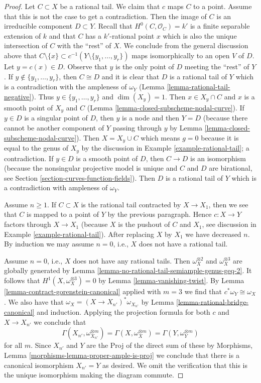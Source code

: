 \documentclass{stacks-project}
\theoremstyle{plain}
\theoremstyle{definition}
\theoremstyle{remark}
\numberwithin{equation}{subsection}
\begin{document}
\begin{proof}
\medskip\noindent
Let $C \subset X$ be a rational tail.
We claim that $c$ maps $C$ to a point. Assume that this
is not the case to get a contradiction. Then the image
of $C$ is an irreducible component $D \subset Y$.
Recall that $H^0(C, \mathcal{O}_C) = k'$ is a finite separable
extension of $k$ and that $C$ has a $k'$-rational point $x$
which is also the unique intersection of $C$ with the ``rest'' of $X$.
We conclude from the general discussion above that
$C \setminus \{x\} \subset c^{-1}(Y \setminus \{y_1, \ldots, y_r\})$
maps isomorphically to an open $V$ of $D$. Let $y = c(x) \in D$.
Observe that $y$ is the only point of $D$ meeting the
``rest'' of $Y$. If $y \not \in \{y_1, \ldots, y_r\}$, then $C \cong D$
and it is clear that $D$ is a rational tail of $Y$ which is
a contradiction with the ampleness of $\omega_Y$
(Lemma \ref{lemma-rational-tail-negative}).
Thus $y \in \{y_1, \ldots, y_r\}$ and $\dim(X_y) = 1$.
Then $x \in X_y \cap C$ and $x$ is a smooth point of $X_y$ and $C$
(Lemma \ref{lemma-closed-subscheme-nodal-curve}).
If $y \in D$ is a singular point of $D$, then $y$ is a node
and then $Y = D$ (because there cannot be another component of
$Y$ passing through $y$ by Lemma \ref{lemma-closed-subscheme-nodal-curve}).
Then $X = X_y \cup C$ which means $g = 0$ because it is
equal to the genus of $X_y$ by the discussion in
Example \ref{example-rational-tail}; a contradiction.
If $y \in D$ is a smooth point of $D$, then
$C \to D$ is an isomorphism (because the nonsingular projective
model is unique and $C$ and $D$ are birational, see
Section \ref{section-curves-function-fields}). Then $D$ is
a rational tail of $Y$ which is a contradiction with
ampleness of $\omega_Y$.

\medskip\noindent
Assume $n \geq 1$. If $C \subset X$ is the rational tail contracted
by $X \to X_1$, then we see that $C$ is mapped to a point of $Y$ by
the previous paragraph. Hence $c : X \to Y$ factors through $X \to X_1$
(because $X$ is the pushout of $C$ and $X_1$, see discussion in
Example \ref{example-rational-tail}).
After replacing $X$ by $X_1$ we have decreased
$n$. By induction we may assume $n = 0$, i.e., $X$ does not have
a rational tail.

\medskip\noindent
Assume $n = 0$, i.e., $X$ does not have any rational tails.
Then $\omega_X^{\otimes 2}$ and $\omega_X^{\otimes 3}$ are
globally generated by Lemma \ref{lemma-no-rational-tail-semiample-genus-geq-2}.
It follows that $H^1(X, \omega_X^{\otimes 3}) = 0$ by
Lemma \ref{lemma-vanishing-twist}.
By Lemma \ref{lemma-contract-gorenstein-canonical} applied with $m = 3$
we find that $c^*\omega_Y \cong \omega_X$.
We also have that $\omega_X = (X \to X_{n'})^*\omega_{X_{n'}}$ by
Lemma \ref{lemma-rational-bridge-canonical} and induction.
Applying the projection formula for both $c$ and
$X \to X_{n'}$ we conclude that
$$
\Gamma(X_{n'}, \omega_{X_{n'}}^{\otimes m}) =
\Gamma(X, \omega_X^{\otimes m}) =
\Gamma(Y, \omega_Y^{\otimes m})
$$
for all $m$.
Since $X_{n'}$ and $Y$ are the Proj of the direct sum of these
by Morphisms, Lemma \ref{morphisms-lemma-proper-ample-is-proj}
we conclude that there is a canonical isomorphism $X_{n'} = Y$
as desired. We omit the verification that this is the unique
isomorphism making the diagram commute.
\end{proof}
\end{document}
